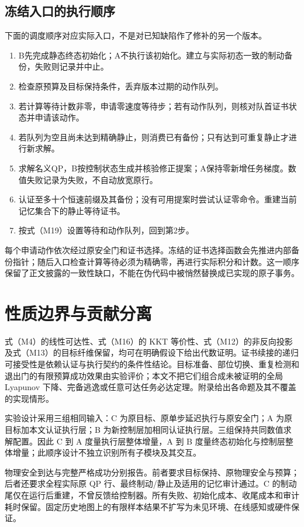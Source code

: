 \subsection{冻结入口的执行顺序}
下面的调度顺序对应实际入口，不是对已知缺陷作了修补的另一个版本。
\begin{enumerate}
\item B先完成静态终态初始化；A不执行该初始化。建立与实际初态一致的制动备份，失败则记录并中止。
\item 检查原预算及目标保持条件，丢弃版本过期的动作队列。
\item 若计算等待计数非零，申请零速度等待步；若有动作队列，则核对队首证书状态并申请该动作。
\item 若队列为空且尚未达到精确静止，则消费已有备份；只有达到可重复静止才进行新求解。
\item 求解名义QP，B按控制状态生成并核验修正提案；A保持零新增任务梯度。数值失败记录为失败，不自动放宽原行。
\item 认证至多十个恒速前缀及其备份；没有可用提案时尝试认证零命令。重建当前记忆集合下的静止等待证书。
\item 按式（M19）设置等待和动作队列，回到第2步。
\end{enumerate}
每个申请动作依次经过原安全门和证书选择。冻结的证书选择函数会先推进内部备份指针；随后入口检查计算等待必须为精确零，再进行实际积分和计数。这一顺序保留了正文披露的一致性缺口，不能在伪代码中被悄然替换成已实现的原子事务。

\section{性质边界与贡献分离}
式（M4）的线性可达性、式（M16）的 KKT 等价性、式（M12）的非反向投影及式（M13）的目标纤维保留，均可在明确假设下给出代数证明。证书续接的递归可接受性是依赖认证与执行契约的条件性结论。目标准备、部位切换、重复检测和退出门的有限预算成功效果由实验评价；本文不把它们组合成未被证明的全局 Lyapunov 下降、完备逃逸或任意可达任务必达定理。附录给出各命题及其不覆盖的实现情形。

实验设计采用三组相同输入：C 为原目标、原单步延迟执行与原安全门；A 为原目标加本文认证执行层；B 为新控制层加相同认证执行层。三组保持共同数值求解配置。因此 C 到 A 度量执行层整体增量，A 到 B 度量终态初始化与控制层整体增量；此顺序设计不独立识别所有子模块及其交互。

物理安全到达与完整严格成功分别报告。前者要求目标保持、原物理安全与预算；后者还要求全程实际原 QP 行、最终制动/静止及适用的记忆审计通过。C 的制动尾仅在运行后重建，不曾反馈给控制器。所有失败、初始化成本、收尾成本和审计耗时保留。固定历史地图上的有限样本结果不扩写为未见环境、在线感知或硬件保证。
